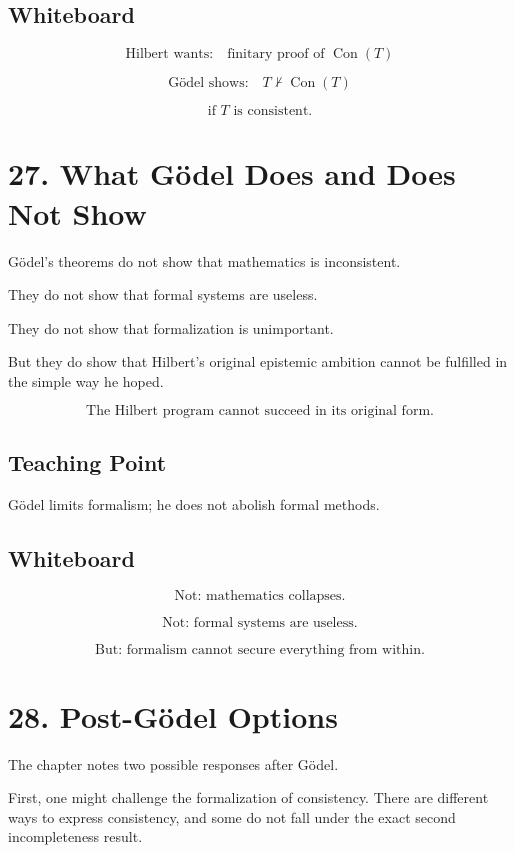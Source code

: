 \documentclass[11pt]{article}
\begin{document}
\subsection*{Whiteboard}

\[
\text{Hilbert wants:}
\quad
\text{finitary proof of } \operatorname{Con}(T)
\]

\[
\text{G\"odel shows:}
\quad
T \nvdash \operatorname{Con}(T)
\]

\[
\text{if }T\text{ is consistent.}
\]

\section*{27. What G\"odel Does and Does Not Show}

G\"odel's theorems do not show that mathematics is inconsistent.

They do not show that formal systems are useless.

They do not show that formalization is unimportant.

But they do show that Hilbert's original epistemic ambition cannot be fulfilled in the
simple way he hoped.

\[
\boxed{
\text{The Hilbert program cannot succeed in its original form.}
}
\]

\subsection*{Teaching Point}

G\"odel limits formalism; he does not abolish formal methods.

\subsection*{Whiteboard}

\[
\text{Not: mathematics collapses.}
\]

\[
\text{Not: formal systems are useless.}
\]

\[
\text{But: formalism cannot secure everything from within.}
\]

\section*{28. Post-G\"odel Options}

The chapter notes two possible responses after G\"odel.

First, one might challenge the formalization of consistency. There are different ways to
express consistency, and some do not fall under the exact second incompleteness result.
\end{document}
